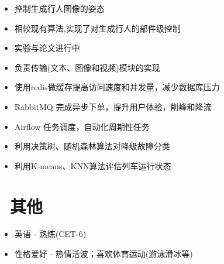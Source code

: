 \documentclass{resume}
\begin{document}
\begin{itemize}[topsep = 0 pt, partopsep = 0pt]
  \item 控制生成行人图像的姿态
  \item 相较现有算法,实现了对生成行人的部件级控制
  \item 实验与论文进行中
\end{itemize}

\begin{itemize}[topsep = 0 pt, partopsep = 0pt]
  \item 负责传输(文本、图像和视频)模块的实现
\end{itemize}

\begin{itemize}[topsep = 0 pt, partopsep = 0pt]
  \item 使用redis做缓存提高访问速度和并发量，减少数据库压力
  \item RabbitMQ 完成异步下单，提升用户体验，削峰和降流
  \item Airflow 任务调度，自动化周期性任务
\end{itemize}

\begin{itemize}[topsep = 0 pt, partopsep = 0pt]
  \item 利用决策树、随机森林算法对降级故障分类
  \item 利用K-means、KNN算法评估列车运行状态
\end{itemize}

\section{\faInfo\ 其他}
\begin{itemize}[parsep=0.5ex]
  \item  英语 - 熟练(CET-6)
  \item  性格爱好 - 热情活波；喜欢体育运动(游泳滑冰等)
\end{itemize}
\end{document}
